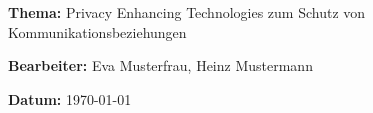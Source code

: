 \documentclass[fontsize=12pt,parskip=half]{scrartcl}
\begin{document}
\textbf{\textsf{Thema:}} Privacy Enhancing Technologies zum Schutz von Kommunikationsbeziehungen

\textbf{\textsf{Bearbeiter:}} Eva Musterfrau, Heinz Mustermann

\textbf{\textsf{Datum:}} \today

\nocite{*} %

\begin{raggedright}
  \printbibliography
\end{raggedright}
\end{document}
